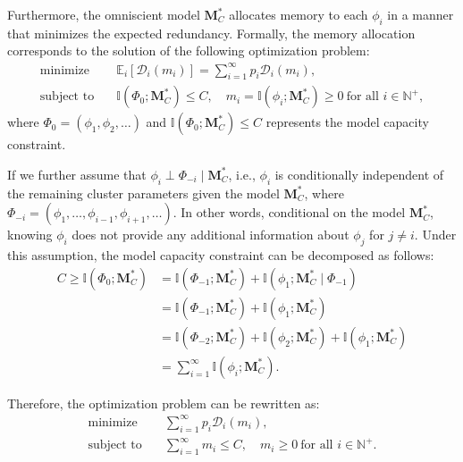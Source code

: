 \documentclass[11pt]{article}
\theoremstyle{plain}
\theoremstyle{definition}
\newcommand{\capacity}{C}
\newcommand{\Model}{\boldsymbol{M}}
\newcommand{\ratedistortion}{\mathcal{D}}
\newcommand{\jian}[1]{{\it \color{red}{Jian: #1}}}
\begin{document}
Furthermore, the omniscient model \( \Model^*_C \) allocates memory to each \( \phi_i \) in a manner that minimizes the expected redundancy. Formally, the memory allocation corresponds to the solution of the following optimization problem:
\begin{align}
    \text{minimize} \quad & \mathbb{E}_i[\ratedistortion_i(m_i)] = \sum_{i=1}^{\infty} p_i \ratedistortion_i(m_i),   \nonumber \\
    \text{subject to} \quad & \mathbb{I}(\Phi_0; \Model^*_C) \le C, \quad m_i = \mathbb{I}(\phi_i; \Model^*_C) \ge 0 \ \text{for all } i \in \mathbb{N}^+, \nonumber
\end{align}
where \( \Phi_0 = (\phi_1, \phi_2, \ldots) \) and $\mathbb{I}(\Phi_0; \Model^*_C) \le C$ represents the model capacity constraint.

If we further assume that \( \phi_i \perp \Phi_{-i} \mid \Model^*_\capacity \), i.e., \( \phi_i \) is conditionally independent of the remaining cluster parameters given the model \( \Model^*_\capacity \),
where 
\( \Phi_{-i} = (\phi_{1},\ldots, \phi_{i-1}, \phi_{i+1}, \ldots) \).
In other words, conditional on the model \( \Model^*_\capacity \), knowing \(\phi_i\) does not provide any additional information about \(\phi_{j}\) for \(j \neq i\). 
Under this assumption, the model capacity constraint can be decomposed as follows:
\begin{align*}
    C\ge\mathbb{I}(\Phi_0; \Model^*_C) 
    &= \mathbb{I}(\Phi_{-1}; \Model^*_C) + \mathbb{I}(\phi_1; \Model^*_C \mid \Phi_{-1}) \\
    &= \mathbb{I}(\Phi_{-1}; \Model^*_C) + \mathbb{I}(\phi_1; \Model^*_C) \\
    &= \mathbb{I}(\Phi_{-2}; \Model^*_C) + \mathbb{I}(\phi_2; \Model^*_C) + \mathbb{I}(\phi_1; \Model^*_C) \\
    &= \sum_{i=1}^{\infty} \mathbb{I}(\phi_i; \Model^*_C).
\end{align*}

Therefore, the optimization problem can be rewritten as:
\begin{align}
    \text{minimize} \quad & \sum_{i=1}^{\infty} p_i \ratedistortion_i(m_i), \label{app:model scaling} \\
    \text{subject to} \quad & \sum_{i=1}^{\infty} m_i \le C, \quad m_i \ge 0 \ \text{for all } i \in \mathbb{N}^+. \nonumber
\end{align}
\end{document}
